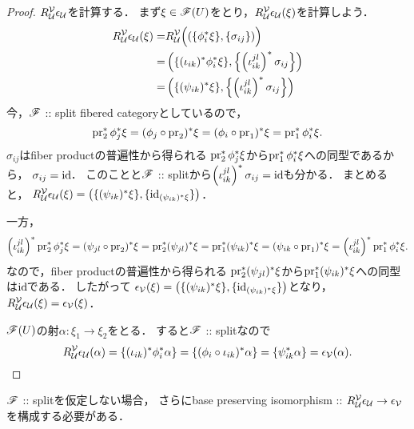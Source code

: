 \documentclass[a4paper]{jsarticle}
\begin{document}
\begin{proof}
    $R_{\covU}^{\covV}\epsilon_{\covU}$を計算する．
    まず$\xi \in \fibF(U)$をとり，$R_{\covU}^{\covV}\epsilon_{\covU}(\xi)$を計算しよう．
    \begin{align*}
        R_{\covU}^{\covV}\epsilon_{\covU}(\xi)
        =&  R_{\covU}^{\covV}\Big( (\{\phi_i^*\xi\}, \{\sigma_{ij}\}) \Big) \\
        =&  \left(\{(\iota_{ik})^*\phi_i^*\xi\}, \left\{\left(\iota_{ik}^{jl}\right)^*\sigma_{ij} \right\}\right) \\
        =&  \left(\{(\psi_{ik})^*\xi\}, \left\{\left(\iota_{ik}^{jl}\right)^*\sigma_{ij} \right\}\right)
    \end{align*}
    今，$\fibF$ :: split fibered categoryとしているので，
    \[ \pr_2^*\phi_j^* \xi=(\phi_j \circ \pr_2)^*\xi=(\phi_i \circ \pr_1)^*\xi=\pr_1^*\phi_i^* \xi. \]
    $\sigma_{ij}$はfiber productの普遍性から得られる
    $\pr_2^*\phi_j^* \xi$から$\pr_1^*\phi_i^* \xi$への同型であるから，
    $\sigma_{ij}=\id$．
    このことと$\fibF$ :: splitから$\left(\iota_{ik}^{jl}\right)^*\sigma_{ij}=\id$も分かる．
    まとめると，
    $R_{\covU}^{\covV}\epsilon_{\covU}(\xi)=\left(\{(\psi_{ik})^*\xi\}, \{\id[(\psi_{ik})^*\xi]\}\right)$．

    一方，
    \[
        \left(\iota_{ik}^{jl}\right)^*\pr_2^*\phi_j^* \xi
        =(\psi_{jl} \circ \pr_2)^*\xi
        =\pr_2^*(\psi_{jl})^*\xi
        =\pr_1^*(\psi_{ik})^*\xi
        =(\psi_{ik} \circ \pr_1)^*\xi
        =\left(\iota_{ik}^{jl}\right)^*\pr_1^*\phi_i^* \xi.
    \]
    なので，fiber productの普遍性から得られる
    $\pr_2^*(\psi_{jl})^*\xi$から$\pr_1^*(\psi_{ik})^*\xi$への同型は$\id$である．
    したがって
    $\epsilon_{\covV}(\xi)=\left(\{(\psi_{ik})^*\xi\}, \{\id[(\psi_{ik})^*\xi]\}\right)$となり，
    $R_{\covU}^{\covV}\epsilon_{\covU}(\xi)=\epsilon_{\covV}(\xi)$．
    
    $\fibF(U)$の射$\alpha \colon \xi_1 \to \xi_2$をとる．
    すると$\fibF$ :: splitなので
    \[
        R_{\covU}^{\covV}\epsilon_{\covU}(\alpha)
        =\{(\iota_{ik})^*\phi_i^*\alpha\}=\{(\phi_i \circ \iota_{ik})^*\alpha\}=\{\psi_{ik}^*\alpha\}
        =\epsilon_{\covV}(\alpha).
    \]
\end{proof}
\begin{Remark}
    $\fibF$ :: splitを仮定しない場合，
    さらにbase preserving isomorphism ::
    $R_{\covU}^{\covV}\epsilon_{\covU} \to \epsilon_{\covV}$を構成する必要がある．
\end{Remark}
\end{document}
